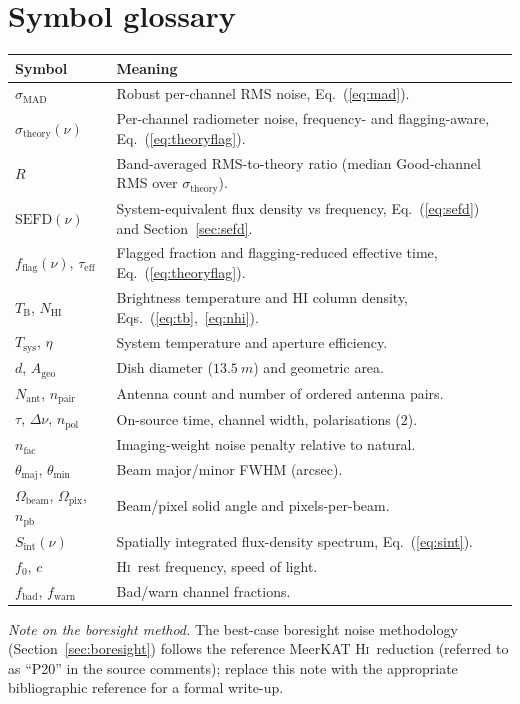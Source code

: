 \documentclass[11pt,a4paper]{article}
\begin{document}
\section{Symbol glossary}\label{app:symbols}
\begin{longtable}{@{}l L{0.74\textwidth}@{}}
\toprule
\textbf{Symbol} & \textbf{Meaning}\\
\midrule
\endhead
$\sigma_{\mathrm{MAD}}$ & Robust per-channel RMS noise, Eq.~(\ref{eq:mad}).\\
$\sigma_{\mathrm{theory}}(\nu)$ & Per-channel radiometer noise, frequency- and flagging-aware, Eq.~(\ref{eq:theoryflag}).\\
$R$ & Band-averaged RMS-to-theory ratio (median \textsf{Good}-channel RMS over $\sigma_{\mathrm{theory}}$).\\
$\mathrm{SEFD}(\nu)$ & System-equivalent flux density vs frequency, Eq.~(\ref{eq:sefd}) and Section~\ref{sec:sefd}.\\
$f_{\mathrm{flag}}(\nu)$, $\tau_{\mathrm{eff}}$ & Flagged fraction and flagging-reduced effective time, Eq.~(\ref{eq:theoryflag}).\\
$T_{\mathrm B}$, $N_{\mathrm{HI}}$ & Brightness temperature and HI column density, Eqs.~(\ref{eq:tb},~\ref{eq:nhi}).\\
$T_{\mathrm{sys}}$, $\eta$ & System temperature and aperture efficiency.\\
$d$, $A_{\mathrm{geo}}$ & Dish diameter ($\SI{13.5}{m}$) and geometric area.\\
$N_{\mathrm{ant}}$, $n_{\mathrm{pair}}$ & Antenna count and number of ordered antenna pairs.\\
$\tau$, $\Delta\nu$, $n_{\mathrm{pol}}$ & On-source time, channel width, polarisations ($2$).\\
$n_{\mathrm{fac}}$ & Imaging-weight noise penalty relative to natural.\\
$\theta_{\mathrm{maj}}$, $\theta_{\mathrm{min}}$ & Beam major/minor FWHM (arcsec).\\
$\Omega_{\mathrm{beam}}$, $\Omega_{\mathrm{pix}}$, $n_{\mathrm{pb}}$ & Beam/pixel solid angle and pixels-per-beam.\\
$S_{\mathrm{int}}(\nu)$ & Spatially integrated flux-density spectrum, Eq.~(\ref{eq:sint}).\\
$f_0$, $c$ & \textsc{Hi}\ rest frequency, speed of light.\\
$f_{\mathrm{bad}}$, $f_{\mathrm{warn}}$ & Bad/warn channel fractions.\\
\bottomrule
\end{longtable}

\noindent\emph{Note on the boresight method.} The best-case boresight noise
methodology (Section~\ref{sec:boresight}) follows the reference MeerKAT
\textsc{Hi}\ reduction (referred to as ``P20'' in the source comments); replace
this note with the appropriate bibliographic reference for a formal write-up.



\end{document}
